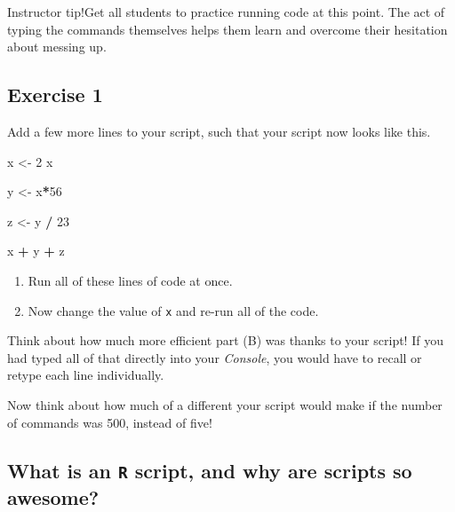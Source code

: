 \documentclass[
]{book}
\newenvironment{Shaded}{\begin{snugshade}}{\end{snugshade}}
\newcommand{\DecValTok}[1]{\textcolor[rgb]{0.00,0.00,0.81}{#1}}
\newcommand{\NormalTok}[1]{#1}
\newcommand{\OperatorTok}[1]{\textcolor[rgb]{0.81,0.36,0.00}{\textbf{#1}}}
\newcommand{\StringTok}[1]{\textcolor[rgb]{0.31,0.60,0.02}{#1}}
\providecommand{\tightlist}{%
  \setlength{\itemsep}{0pt}\setlength{\parskip}{0pt}}
\begin{document}
Instructor tip!Get all students to practice running code at this point. The act of typing the commands themselves helps them learn and overcome their hesitation about messing up.

\hypertarget{exercise-1-1}{%
\subsection*{Exercise 1}\label{exercise-1-1}}

Add a few more lines to your script, such that your script now looks like this.

\begin{Shaded}
\begin{Highlighting}[]
\NormalTok{x <-}\StringTok{ }\DecValTok{2} 
\NormalTok{x}

\NormalTok{y <-}\StringTok{ }\NormalTok{x}\OperatorTok{*}\DecValTok{56}

\NormalTok{z <-}\StringTok{ }\NormalTok{y }\OperatorTok{/}\StringTok{ }\DecValTok{23}
 
\NormalTok{x }\OperatorTok{+}\StringTok{ }\NormalTok{y }\OperatorTok{+}\StringTok{ }\NormalTok{z}
\end{Highlighting}
\end{Shaded}

\begin{enumerate}
\def\labelenumi{(\Alph{enumi})}
\tightlist
\item
  Run all of these lines of code at once.\\
\item
  Now change the value of \texttt{x} and re-run all of the code.
\end{enumerate}

Think about how much more efficient part (B) was thanks to your script! If you had typed all of that directly into your \emph{Console}, you would have to recall or retype each line individually.

Now think about how much of a different your script would make if the number of commands was 500, instead of five!

\hypertarget{what-is-an-r-script-and-why-are-scripts-so-awesome}{%
\subsection*{\texorpdfstring{What is an \texttt{R} script, and why are scripts so awesome?}{What is an R script, and why are scripts so awesome?}}\label{what-is-an-r-script-and-why-are-scripts-so-awesome}}
\end{document}
